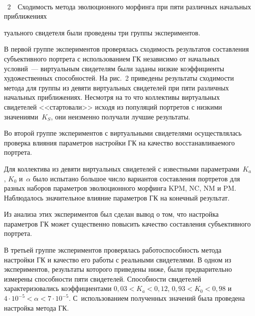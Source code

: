 \begin{multicols}{2}
\noindent
\begin{center} %
\mbox{%
\epsfxsize=77.822mm
}
\end{center}
\vspace*{6pt}
{{\figurename~2}\ \ \small{Сходимость метода эволюционного морфинга при пяти различных начальных 
приближениях}}


\bigskip
\bigskip
\addtocounter{figure}{1}


\noindent
туального свидетеля были проведены три группы 
экспериментов.

     
    В первой группе экспериментов проверялась сходимость результатов 
составления субъективного портрета с использованием ГК независимо от 
начальных условий~--- виртуальным свидетелям были заданы низкие 
коэффициенты художественных способностей. На рис.~2 приведены 
результаты сходимости метода для группы из девяти виртуальных свидетелей 
при пяти различных начальных приближениях. Несмотря на то что коллективы 
виртуальных свидетелей <<стартовали>> исходя из популяций портретов с 
низкими значениями~$K_S$, они неизменно получали лучшие результаты.
     
     Во второй группе экспериментов с виртуальными свидетелями 
осуществлялась проверка влияния параметров настройки ГК на качество 
восстанавливаемого портрета.

     Для коллектива из девяти виртуальных свидетелей с известными 
параметрами~$K_a$, $K_0$ и~$\alpha$ было испытано большое число 
вариантов составления портретов для разных наборов параметров 
эволюционного морфинга KPM, NC, NM и PM. Наблюдалось значительное 
влияние параметров ГК на конечный результат. 
     
     Из анализа этих экспериментов был сделан вывод о том, что настройка 
параметров ГК может существенно повысить качество составления 
субъективного портрета. 


     В третьей группе экспериментов проверялась работоспособность метода 
настройки ГК и качество его работы с реальными свидетелями. В одном из 
экспериментов, результаты которого приведены ниже, были предварительно 
измерены способности пяти свидетелей. Способности свидетелей 
характеризовались коэффициентами $0{,}03 <K_a < 0{,}12$, 
$0{,}93 <K_0< 0{,}98$ и $4\cdot 10^{-5} <\alpha< 7\cdot 10^{-5}$. С~использованием 
полученных значений была проведена настройка метода ГК.
     

\end{multicols}
